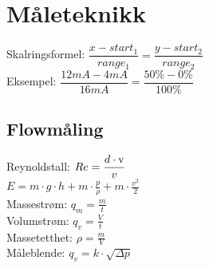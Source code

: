\section{Måleteknikk}
\vskip 2.5pt 
Skalringsformel:
$\dfrac{x-start_1}{range_1}=\dfrac{y-start_2}{range_2}$\\
\vskip 2.5pt 
Eksempel: $\dfrac{12mA-4mA}{16mA}=\dfrac{50\%-0\%}{100\%}$
\vskip 2.5pt 
\subsection*{Flowmåling}
\vskip 2.5pt 
Reynoldstall: $Re=\dfrac {d \cdot \text v}{v}$\\
\vskip 2.5pt 
$E=m\cdot g\cdot h+m\cdot \frac{p}{\rho}+m\cdot \frac {v^2}{2} $\\
\vskip 2.5pt 
Massestrøm: $q_m=\frac{m}{t}$\\
\vskip 2.5pt 
Volumstrøm: $q_v=\frac{V}{t}$\\
\vskip 2.5pt 
Massetetthet: $\rho=\frac{m}{V}$\\
\vskip 2.5pt 
Måleblende: $q_v=k\cdot \sqrt{\Delta p}$\\
\vskip 2.5pt 
